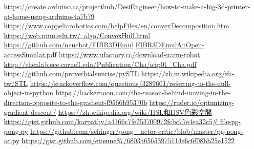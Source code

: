 \newpage
\renewcommand\bibname{參~考~文~獻}
\begin{thebibliography}{99}  %
\href{https://create.arduino.cc/projecthub/DesiEngineer/how-to-make-a-big-3d-printer-at-home-using-arduino-4a7b79}{https://create.arduino.cc/projecthub/DesiEngineer/how-to-make-a-big-3d-printer-at-home-using-arduino-4a7b79}
\href{https://www.coppeliarobotics.com/helpFiles/en/convexDecomposition.htm}{https://www.coppeliarobotics.com/helpFiles/en/convexDecomposition.htm}
\href{https://web.ntnu.edu.tw/~algo/ConvexHull.html}{https://web.ntnu.edu.tw/~algo/ConvexHull.html}
\href{https://github.com/neuebot/FIBR3DEmul}{https://github.com/neuebot/FIBR3DEmul}
\href{https://repositorium.sdum.uminho.pt/bitstream/1822/69730/1/Faria2020_Article_FIBR3DEmulAnOpen-accessSimulat.pdf}{FIBR3DEmulAnOpen-accessSimulat.pdf}
\href{https://www.ufactory.cc/download-uarm-robot}{https://www.ufactory.cc/download-uarm-robot}
\href{http://chenlab.ece.cornell.edu/Publication/Cha/icip01_Cha.pdf}{http://chenlab.ece.cornell.edu/Publication/Cha/icip01_Cha.pdf}\label{R.Policy Gradient}
\href{https://github.com/proverbialsunrise/pySTL}{https://github.com/proverbialsunrise/pySTL}
\href{https://zh.m.wikipedia.org/zh-tw/STL}{https://zh.m.wikipedia.org/zh-tw/STL}
\href{https://stackoverflow.com/questions/3289601/referring-to-the-null-object-in-python}{https://stackoverflow.com/questions/3289601/referring-to-the-null-object-in-python}
\href{https://hackernoon.com/the-reason-behind-moving-in-the-direction-opposite-to-the-gradient-f9566b95370b}{https://hackernoon.com/the-reason-behind-moving-in-the-direction-opposite-to-the-gradient-f9566b95370b}\label{OGD}
\href{https://ruder.io/optimizing-gradient-descent/}{https://ruder.io/optimizing-gradient-descent/}
\label{OGD2}
\href{https://reurl.cc/43XjEL}{https://zh.wikipedia.org/wiki/HSL和HSV色彩空間}
\label{RGBtoHSV}
\href{https://reurl.cc/gzMm4N}{https://gist.github.com/karpathy/a4166c7fe253700972fcbc77e4ea32c5\# file-pg-pong-py}\label{R.pong1}
\href{https://reurl.cc/95172Y}{https://github.com/schinger/pong\_ actor-critic/blob/master/pg-pong-ac.py}\label{R.pong1.1}
\href{https://gist.github.com/etienne87/6803a65653975114e6c6f08bb25e1522}{https://gist.github.com/etienne87/6803a65653975114e6c6f08bb25e1522}\label{R.pong2}
%
\end{thebibliography}
\newpage 